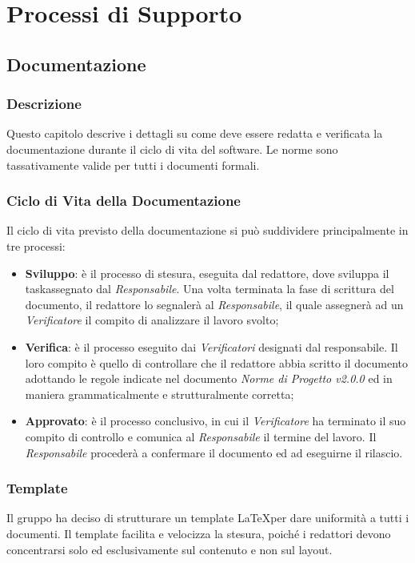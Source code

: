 \section{Processi di Supporto}\label{ProcessiSupporto}

\subsection{Documentazione}\label{ProcessiSupporto_Documentazione}

\subsubsection{Descrizione}
Questo capitolo descrive i dettagli su come deve essere redatta e verificata la documentazione durante il ciclo di vita del software. Le norme sono tassativamente valide per tutti i documenti formali.
\subsubsection{Ciclo di Vita della Documentazione}
Il ciclo di vita previsto della documentazione si può suddividere principalmente in tre processi: 
\begin{itemize}
	\item \textbf{Sviluppo}: è il processo di stesura, eseguita dal redattore, dove sviluppa il task\glossario assegnato dal \textit{Responsabile}. Una volta terminata la fase di scrittura del documento, il redattore lo segnalerà al \textit{Responsabile}, il quale assegnerà ad un \textit{Verificatore} il compito di analizzare il lavoro svolto;
 	\item \textbf{Verifica}: è il processo eseguito dai \textit{Verificatori} designati dal responsabile. Il loro compito è quello di controllare che il redattore abbia scritto il documento adottando le regole indicate nel documento \textit{Norme di Progetto v2.0.0} ed in maniera grammaticalmente e strutturalmente corretta;
 	\item \textbf{Approvato}: è il processo conclusivo, in cui il \textit{Verificatore} ha terminato il suo compito di controllo e comunica al \textit{Responsabile} il termine del lavoro. Il \textit{Responsabile} procederà a confermare il documento ed ad eseguirne il rilascio.
\end{itemize} 

\subsubsection{Template}
Il gruppo ha deciso di strutturare un template \LaTeX  per dare uniformità a tutti i documenti. Il template facilita e velocizza la stesura, poiché i redattori devono concentrarsi solo ed esclusivamente sul contenuto e non sul layout.  

